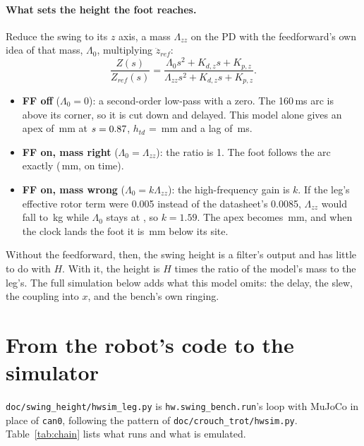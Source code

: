 \documentclass[11pt,a4paper]{article}
\newcommand{\code}[1]{\texttt{#1}}
\begin{document}
\paragraph{What sets the height the foot reaches.} Reduce the swing to its $z$
axis, a mass $\Lambda_{zz}$ on the PD with the feedforward's own idea of that
mass, $\Lambda_0$, multiplying $\ddot z_{ref}$:
\begin{equation}
\frac{Z(s)}{Z_{ref}(s)} = \frac{\Lambda_0 s^2 + K_{d,z}s + K_{p,z}}{\Lambda_{zz}s^2 + K_{d,z}s + K_{p,z}} .
\label{eq:tf}
\end{equation}
\begin{itemize}[leftmargin=1.5em]
\item \textbf{FF off} ($\Lambda_0 = 0$): a second-order low-pass with a zero.
The 160\,ms arc is above its corner, so it is cut down and delayed. This model
alone gives an apex of \LinApexOff\,mm at $s=0.87$, $h_{td}$ =
\LinHtdOff\,mm and a lag of \LinLagOff\,ms.
\item \textbf{FF on, mass right} ($\Lambda_0 = \Lambda_{zz}$): the ratio is 1.
The foot follows the arc exactly (\LinApexOn\,mm, on time).
\item \textbf{FF on, mass wrong} ($\Lambda_0 = k\Lambda_{zz}$): the
high-frequency gain is $k$. If the leg's effective rotor term were 0.005
instead of the datasheet's 0.0085, $\Lambda_{zz}$ would fall to \LamZFive\,kg
while $\Lambda_0$ stays at \LamZ, so $k = 1.59$. The apex becomes \LinApexArmOn\,mm, and when the clock lands the
foot it is \LinHtdArmOnAbs\,mm below its site.
\end{itemize}
Without the feedforward, then, the swing height is a filter's output and has
little to do with $H$. With it, the height is $H$ times the ratio of the model's
mass to the leg's. The full simulation below adds what this model omits: the
delay, the slew, the coupling into $x$, and the bench's own ringing.

\section{From the robot's code to the simulator}
\label{sec:hw2sim}

\code{doc/swing\_height/hwsim\_leg.py} is \code{hw.swing\_bench.run}'s loop
with MuJoCo in place of \code{can0}, following the pattern of
\code{doc/crouch\_trot/hwsim.py}. Table~\ref{tab:chain} lists what runs and
what is emulated.
\end{document}
